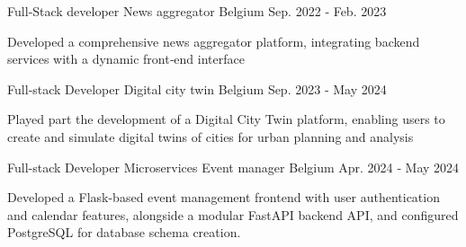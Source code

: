 

\begin{cventries}


  \cventry
    {Full‑Stack developer} %
    {News aggregator} %
    {Belgium} %
    {Sep. 2022 ‑ Feb. 2023} %
    {
      \begin{cvitems} %
        \item {Developed a comprehensive news aggregator platform, integrating backend services with a dynamic front‑end interface}
      \end{cvitems}
    }


  \cventry
    {Full‑stack Developer} %
    {Digital city twin} %
    {Belgium} %
    {Sep. 2023 ‑ May 2024} %
    {
      \begin{cvitems} %
        \item {Played part the development of a Digital City Twin platform, enabling users to create and simulate digital twins of cities for urban planning and analysis}
      \end{cvitems}
    }


  \cventry
  {Full-stack Developer} %
  {Microservices Event manager} %
  {Belgium} %
  {Apr. 2024 ‑ May 2024} %
  {
    \begin{cvitems} %
      \item {Developed a Flask-based event management frontend with user authentication and calendar features, alongside a modular FastAPI backend API, and configured PostgreSQL for database schema creation.}
    \end{cvitems}
  }


\end{cventries}
